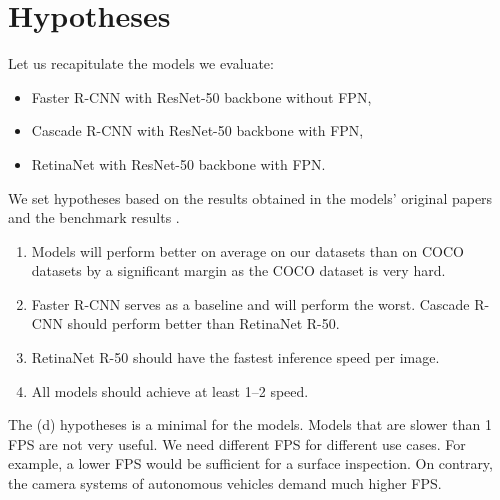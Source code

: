 \section{Hypotheses}
\label{sec:hypotheses}
Let us recapitulate the models we evaluate:
\begin{itemize}
	\item Faster R-CNN with ResNet-50 backbone without FPN,
	\item Cascade R-CNN with ResNet-50 backbone with FPN,
	\item RetinaNet with ResNet-50 backbone with FPN.
\end{itemize}
We set hypotheses based on the results obtained in the models' original papers
\cite{fasterrcnn,cascadercnn,retinanet} and the  benchmark
results \cite{detectron}.

\renewcommand{\theenumi}{\alph{enumi}}
\begin{enumerate}
	\item Models will perform better on average on our datasets than on COCO
	      datasets \cite{coco} by a significant margin as the COCO dataset is
	      very hard.
	\item Faster R-CNN serves as a baseline and will perform the worst. Cascade
	      R-CNN should perform better than RetinaNet R-50.
	\item RetinaNet R-50 should have the fastest inference speed per image.
	\item All models should achieve at least 1–2 
	      speed.
\end{enumerate}

The (d) hypotheses is a minimal  for the models.
Models that are slower than 1 FPS are not very useful. We need different FPS for
different use cases. For example, a lower FPS would be sufficient for a
surface inspection. On contrary, the camera systems of autonomous vehicles
demand much higher FPS.

